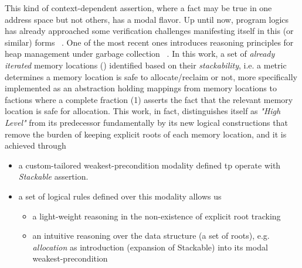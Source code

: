 This kind of context-dependent assertion, where a fact may be true in one address space but not others, has a modal flavor. Up until now, program logics ~\cite{} has already approached some verification challenges manifesting itself in this (or similar) forms ~\cite{}. One of the most recent ones introduces reasoning principles for heap management under garbage collection ~\cite{}. In this work, a set of \textit{already iterated} memory locations () identified based on their \textit{stackability}, i.e. a metric determines a memory location is safe to allocate/reclaim or not, more specifically implemented as an abstraction holding mappings from memory locations to factions where a complete fraction (1) asserts the fact that the relevant memory location is safe for allocation. This work, in fact, distinguishes itself as \textit{"High Level"} from its predecessor fundamentally by its new logical constructions that remove the burden of keeping explicit roots of each memory location, and it is achieved through ~\cite{}
\begin{itemize}
\item a custom-tailored weakest-precondition modality defined tp operate with \textit{Stackable} assertion.
\item a set of logical rules defined over this modality allows us
  \begin{itemize}
  \item  a light-weight reasoning in the non-existence of explicit root tracking
  \item  an intuitive reasoning over the data structure (a set of roots), e.g. \textit{allocation} as introduction (expansion of Stackable) into its modal weakest-precondition
  \end{itemize}
\end{itemize}
